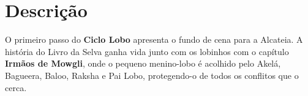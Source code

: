 \chapter[Descrição]{Descrição}
\label{chap:descricao}
	O primeiro passo do \textbf{Ciclo Lobo} apresenta o fundo de cena para a Alcateia. A história do Livro da Selva ganha vida junto com os lobinhos com o capítulo \textbf{Irmãos de Mowgli}, onde o pequeno menino-lobo é acolhido pelo Akelá, Bagueera, Baloo, Raksha e Pai Lobo, protegendo-o de todos os conflitos que o cerca.